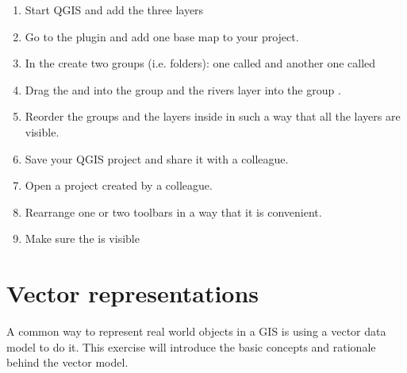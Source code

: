 \documentclass[letterpaper,10pt,english]{sphinxmanual}
\begin{document}
\begin{enumerate}
%
\item {} 
 Start QGIS and add the three layers

\item {} 
 Go to  the plugin  and add one base map to your project.

\item {} 
 In the  create two groups (i.e. folders): one called  and another one called 

\item {} 
 Drag the  and  into the group  and the rivers layer into the group .

\item {} 
 Re\sphinxhyphen{}order the groups and the layers inside in such a way that all the layers are visible.

\item {} 
 Save your QGIS project and share it with a colleague.

\item {} 
 Open a project created by a colleague.

\item {} 
 Re\sphinxhyphen{}arrange one or two toolbars in a way that it is convenient.

\item {} 
 Make sure the  is visible

\end{enumerate}


\chapter{Vector representations}
\label{\detokenize{vector_representations:vector-representations}}\label{\detokenize{vector_representations::doc}}
A common way to represent real world objects in a GIS is using a vector data model to do it.
This exercise will introduce the basic concepts and rationale behind the vector model.
\end{document}
